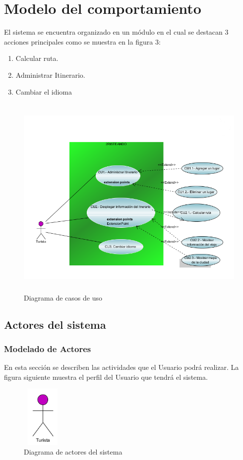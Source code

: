 \section{Modelo del comportamiento}
  El sistema se encuentra organizado en un m\'odulo en el cual se destacan 3 acciones principales como se muestra en la figura 3:
  \begin{enumerate}
   \item Calcular ruta.
   \item Administrar Itinerario.
   \item Cambiar el idioma
  \end{enumerate}
  \begin{figure}[h]
      \centering
      \includegraphics[width=12cm,height=10cm]{Imagenes/CasosUso/CU.png}
      \caption{Diagrama de casos de uso} 
      \label{fig:CU}
  \end{figure}
  
   \subsection{Actores del sistema}
    \subsubsection{Modelado de Actores}
    En esta secci\'on se describen las actividades que el Usuario podr\'a realizar.
    La figura siguiente muestra el perfil del Usuario que tendr\'a el sistema.
    
      \begin{figure}[h]
	\centering
	\includegraphics[width=2cm,height=3cm]{Imagenes/CasosUso/ActorTurista.PNG}
	\caption{Diagrama de actores del sistema}
	\label{fig:actores}
      \end{figure}
      
